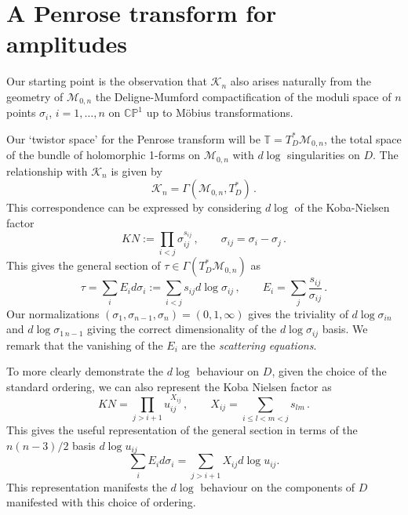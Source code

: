 \documentclass[11pt]{article}
\newcommand{\CP}{\mathbb{CP}}
\newcommand{\T}{\mathbb{T}}
\newcommand{\cK}{\mathcal{K}}
\newcommand{\cM}{\mathcal{M}}
\newcommand{\1}{{\rm 1\hskip-0.25em I}}
\begin{document}
\section{A Penrose transform for amplitudes}

Our  starting point is the observation that $\cK_n$ also arises naturally from the geometry of $\cM_{0,n}$ the Deligne-Mumford compactification of the moduli space of $n$ points $\sigma_i$, $i=1,\ldots,n$ on $\CP^1$ up to M\"obius transformations.  

Our `twistor space' for the Penrose transform will be $\T=T^*_D \cM_{0,n}$, the total space of the bundle of holomorphic 1-forms on $\cM_{0,n}$ with $d\log $ singularities on $D$. The relationship with $\cK_n$ is given by 
\begin{equation}
\cK_n=\Gamma({\cM_{0,n}},T^*_D )\, .
\end{equation}
This correspondence can be expressed by considering $d \log $ of the
 Koba-Nielsen factor \begin{equation}
 KN:=\prod_{i<j} \sigma_{ij}^{s_{ij}}\, , \qquad \sigma_{ij}=\sigma_i-\sigma_j\, .
 \end{equation}
  This gives the general section of $\tau\in \Gamma(T^*_D \cM_{0,n}) $ as 
 \begin{equation}
\tau=\sum_iE_id\sigma_i:= \sum_{i<j} s_{ij}d \log \sigma_{ij}\, , \qquad E_i=\sum_j\frac{s_{ij}}{\sigma_{ij}}\, .
 \end{equation}
Our normalizations $(\sigma_1,\sigma_{n-1},\sigma_n)=(0,1,\infty)$ gives the triviality of $d\log \sigma_{in}$ and $d\log \sigma_{1\,n-1}$ giving the correct dimensionality of the $d\log\sigma_{ij}$ basis. We remark that the vanishing of the $E_i$ are the \emph{scattering equations}.

To more clearly demonstrate the $d\log$ behaviour on $D$, given the choice of the standard ordering, we can also represent the Koba Nielsen factor as 
\begin{equation}
KN=\prod_{j>i+1} u_{ij}^{X_{ij}}\,, \qquad X_{ij}=\sum_{i\leq l<m<j} s_{lm}\, . \label{region-KN}
\end{equation}
This gives the useful representation of the general section in terms of  the $n(n-3)/2$ basis $d\log u_{ij}$
\begin{equation}
\sum_iE_id\sigma_i=\sum_{j>i+1 }X_{ij} d \log u_{ij}.\label{tau-u}
\end{equation}
This representation manifests the $d\log$ behaviour on the components of  $D$ manifested with this choice of ordering.
\end{document}
